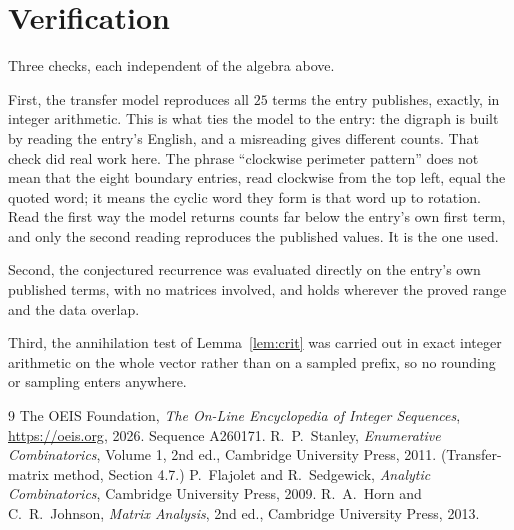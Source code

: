 \documentclass[11pt,a4paper]{article}
\theoremstyle{plain}
\theoremstyle{definition}
\begin{document}
\section{Verification}

Three checks, each independent of the algebra above.

First, the transfer model reproduces all $25$ terms the entry publishes, exactly, in
integer arithmetic. This is what ties the model to the entry: the digraph is built by reading
the entry's English, and a misreading gives different counts. That check did real work here. The phrase ``clockwise perimeter pattern'' does not mean that the eight boundary entries, read clockwise from the top left, equal the quoted word; it means the cyclic word they form is that word up to rotation. Read the first way the model returns counts far below the entry's own first term, and only the second reading reproduces the published values. It is the one used.

Second, the conjectured recurrence was evaluated directly on the entry's own published terms,
with no matrices involved, and holds wherever the proved range and the data overlap.

Third, the annihilation test of Lemma~\ref{lem:crit} was carried out in exact integer
arithmetic on the whole vector rather than on a sampled prefix, so no rounding or sampling
enters anywhere.

\begin{thebibliography}{9}
 The OEIS Foundation, \emph{The On-Line Encyclopedia of Integer
Sequences}, \url{https://oeis.org}, 2026. Sequence A260171.
 R.~P.~Stanley, \emph{Enumerative Combinatorics}, Volume 1, 2nd ed.,
Cambridge University Press, 2011. (Transfer-matrix method, Section 4.7.)
 P.~Flajolet and R.~Sedgewick, \emph{Analytic Combinatorics}, Cambridge
University Press, 2009.
 R.~A.~Horn and C.~R.~Johnson, \emph{Matrix Analysis}, 2nd ed., Cambridge
University Press, 2013.
\end{thebibliography}
\end{document}
